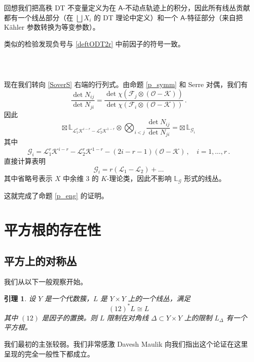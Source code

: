 \documentclass[12pt]{article}
\newcommand{\cO}{\mathscr{O}}
\newcommand{\cL}{\mathscr{L}}
\newcommand{\bL}{\mathbb{L}}
\newcommand{\cF}{\mathscr{F}}
\newcommand{\cG}{\mathscr{G}}
\newcommand{\bA}{\mathsf{A}}
\newcommand{\cK}{\mathscr{K}}
\newtheorem{Lemma}{引理}[section]
\theoremstyle{definition}
\begin{document}
回想我们把高秩 DT 不变量定义为在 $\bA$-不动点轨迹上的积分，因此所有线丛贡献都有一个线丛部分（在 $\bigsqcup X_i$ 的 DT 理论中定义）和一个 $\bA$-特征部分（来自把 Kähler 参数转换为等变参数）。

类似的检验发现负号与 \eqref{deftODT2r} 中前因子的符号一致。

\subsubsection{\ }
现在我们转向 \eqref{SoverS} 右端的行列式。由命题 \ref{p_symm} 和 Serre 对偶，我们有
\begin{equation}
\frac{{\det N_{ij}}}{{\det N_{ji}}} = \frac{\det \chi(\cF_j\otimes
  (\cO -\cK))}{\det \chi(\cF_i\otimes
  (\cO -\cK))} \,.\label{eq:6}
\end{equation}
因此
\begin{equation*}
\boxtimes \, \bL_{\cL_1^r \cK^{i-r}-
\cL_2^r \cK^{1-r}}
\otimes \bigotimes_{i<j} \frac{{\det
    N_{ij}}}{{\det N_{ji}}} =
\boxtimes \, \bL_{\cG_i}
\end{equation*}
其中
$$
\cG_i = \cL_1^r \cK^{i-r}-
\cL_2^r \cK^{1-r} - (2i-r-1)(\cO-\cK) \,, \quad i=1,\dots,r \,.
$$
直接计算表明
$$
\cG_i = r (\cL_1 - \cL_2) + \dots
$$
其中省略号表示 $X$ 中余维 $3$ 的 $K$-理论类，因此不影响 $\bL_{\cG}$ 形式的线丛。

这就完成了命题 \ref{p_eng} 的证明。
\section{平方根的存在性}
\label{s_sqrt}

\subsection{平方上的对称丛}

我们从以下一般观察开始。

\begin{Lemma}
设 $Y$ 是一个代数簇，$L$ 是 $Y \times Y$ 上的一个线丛，满足
$$
(12)^* L \cong L
$$
其中 $(12)$ 是因子的置换。则 $L$ 限制在对角线 $\Delta \subset Y \times Y$ 上的限制 $L_{\Delta}$ 有一个平方根。
\end{Lemma}

\noindent
我们最初的主张较弱。我们非常感激 Davesh Maulik 向我们指出这个论证在这里呈现的完全一般性下都成立。
\end{document}
